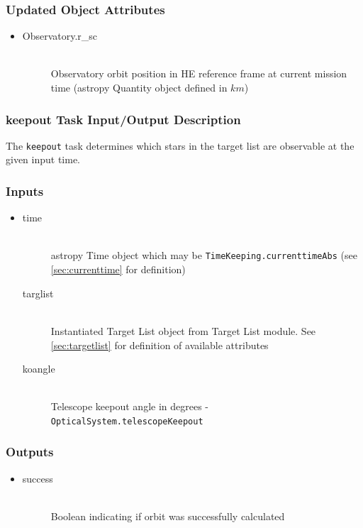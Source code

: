 \documentclass[cleanfoot]{asme2ej}
\begin{document}
\subsubsection*{Updated Object Attributes}
\begin{itemize}
    \item
    \begin{description}
        \item[Observatory.r\_sc] \hfill \\
        Observatory orbit position in HE reference frame at current mission time (astropy Quantity object defined in $ km $)
    \end{description}
\end{itemize}

\subsubsection{keepout Task Input/Output Description} \label{sec:keepouttask} 
The \verb+keepout+ task determines which stars in the target list are observable at the given input time.

\subsubsection*{Inputs}
\begin{itemize}
    \item
    \begin{description}
        \item[time] \hfill \\
        astropy Time object which may be \verb+TimeKeeping.currenttimeAbs+ (see \ref{sec:currenttime} for definition)
        \item[targlist] \hfill \\
        Instantiated Target List object from Target List module. See \ref{sec:targetlist} for definition of available attributes
        \item[koangle] \hfill \\
        Telescope keepout angle in degrees - \verb+OpticalSystem.telescopeKeepout+
    \end{description}
\end{itemize}

\subsubsection*{Outputs}
\begin{itemize}
    \item
    \begin{description}
        \item[success] \hfill \\
        Boolean indicating if orbit was successfully calculated
    \end{description}
\end{itemize}
\end{document}
